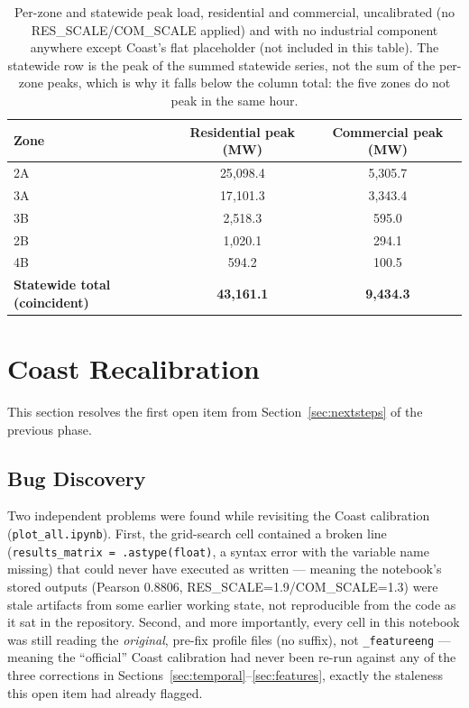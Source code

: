 \documentclass[11pt]{article}
\begin{document}
\begin{table}[H]
\centering
\small
\begin{tabular}{lcc}
\toprule
Zone & Residential peak (MW) & Commercial peak (MW) \\
\midrule
2A & 25{,}098.4 & 5{,}305.7 \\
3A & 17{,}101.3 & 3{,}343.4 \\
3B & 2{,}518.3 & 595.0 \\
2B & 1{,}020.1 & 294.1 \\
4B & 594.2 & 100.5 \\
\midrule
\textbf{Statewide total (coincident)} & \textbf{43{,}161.1} & \textbf{9{,}434.3} \\
\bottomrule
\end{tabular}
\caption{Per-zone and statewide peak load, residential and commercial, uncalibrated
(no RES\_SCALE/COM\_SCALE applied) and with no industrial component anywhere except
Coast's flat placeholder (not included in this table). The statewide row is the peak
of the summed statewide series, not the sum of the per-zone peaks, which is why it
falls below the column total: the five zones do not peak in the same hour.}
\label{tab:statewide_totals}
\end{table}

\section{Coast Recalibration}
\label{sec:recalibration}

This section resolves the first open item from Section~\ref{sec:nextsteps} of the
previous phase.

\subsection{Bug Discovery}

Two independent problems were found while revisiting the Coast calibration
(\texttt{plot\_all.ipynb}). First, the grid-search cell contained a broken line
(\texttt{results\_matrix\ =\ .astype(float)}, a syntax error with the variable name
missing) that could never have executed as written --- meaning the notebook's stored
outputs (Pearson 0.8806, RES\_SCALE=1.9/COM\_SCALE=1.3) were stale artifacts from some
earlier working state, not reproducible from the code as it sat in the repository.
Second, and more importantly, every cell in this notebook was still reading the
\emph{original}, pre-fix profile files (no suffix), not \texttt{\_featureeng} --- meaning
the ``official'' Coast calibration had never been re-run against any of the three
corrections in Sections~\ref{sec:temporal}--\ref{sec:features}, exactly the
staleness this open item had already flagged.
\end{document}
